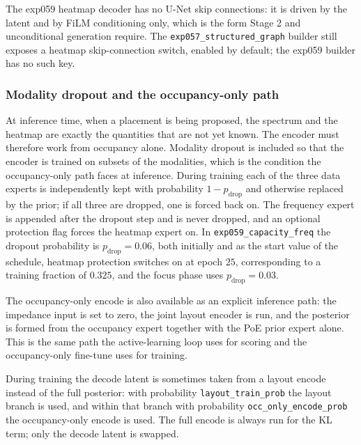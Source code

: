 The exp059 heatmap decoder has no U-Net skip connections: it is driven by the
latent and by FiLM conditioning only, which is the form Stage 2 and unconditional
generation require. The \texttt{exp057\_structured\_graph} builder still exposes
a heatmap skip-connection switch, enabled by default; the exp059 builder has no
such key.

\subsubsection*{Modality dropout and the occupancy-only path}

At inference time, when a placement is being proposed, the spectrum and the
heatmap are exactly the quantities that are not yet known. The encoder must
therefore work from occupancy alone. Modality dropout is included so that the
encoder is trained on subsets of the modalities, which is the condition the
occupancy-only path faces at inference. During training each of the three data
experts is independently kept with probability $1 - p_{\mathrm{drop}}$ and
otherwise replaced by the prior; if all three are dropped, one is forced back on.
The frequency expert is appended after the dropout step and is never dropped, and
an optional protection flag forces the heatmap expert on. In
\texttt{exp059\_capacity\_freq} the dropout probability is
$p_{\mathrm{drop}} = 0.06$, both initially and as the start value of the
schedule, heatmap protection switches on at epoch $25$, corresponding to a
training fraction of $0.325$, and the focus phase uses $p_{\mathrm{drop}} =
0.03$.

The occupancy-only encode is also available as an explicit inference path: the
impedance input is set to zero, the joint layout encoder is run, and the
posterior is formed from the occupancy expert together with the PoE prior expert
alone. This is the same path the active-learning loop uses for scoring and the
occupancy-only fine-tune uses for training.

During training the decode latent is sometimes taken from a layout encode instead
of the full posterior: with probability \texttt{layout\_train\_prob} the layout
branch is used, and within that branch with probability
\texttt{occ\_only\_encode\_prob} the occupancy-only encode is used. The full
encode is always run for the KL term; only the decode latent is swapped.

